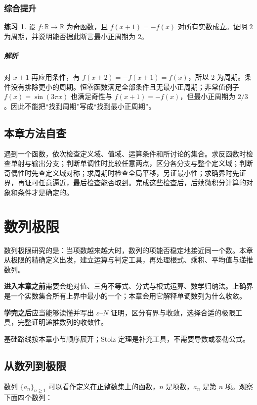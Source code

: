 \documentclass[UTF8,fontset=fandol,12pt,oneside,openany]{ctexrep}
\newcommand{\R}{\mathbb R}
\theoremstyle{definition}
\newtheorem{exercise}{练习}[chapter]
\begin{document}
\subsection{综合提升}
\begin{exercise}
设 $f:\R\to\R$ 为奇函数，且 $f(x+1)=-f(x)$ 对所有实数成立。证明 $2$ 为周期，并说明能否据此断言最小正周期为 $2$。
\end{exercise}
\paragraph{解析} 对 $x+1$ 再应用条件，有 $f(x+2)=-f(x+1)=f(x)$，所以 $2$ 为周期。条件没有排除更小的周期。恒零函数满足全部条件且无最小正周期；非常值例子 $f(x)=\sin(3\pi x)$ 也满足奇性与 $f(x+1)=-f(x)$，但最小正周期为 $2/3$。因此不能把“找到周期”写成“找到最小正周期”。

\section{本章方法自查}
遇到一个函数，依次检查定义域、值域、运算条件和所讨论的集合。求反函数时检查单射与输出分支；判断单调性时比较任意两点，区分各分支与整个定义域；判断奇偶性时先查定义域对称；求周期时检查全局平移，另证最小性；求确界时先证界，再证可任意逼近，最后检查能否取到。完成这些检查后，后续微积分计算的对象和条件才是确定的。


\chapter{数列极限}
\label{lec:02:chapter}

数列极限研究的是：当项数越来越大时，数列的项能否稳定地接近同一个数。本章从极限的精确定义出发，建立运算与判定工具，再处理根式、乘积、平均值与递推数列。


\textbf{进入本章之前}\quad 需要会绝对值、三角不等式、分式与根式运算、数学归纳法。上确界是一个实数集合所有上界中最小的一个；本章会用它解释单调数列为什么收敛。

\textbf{学完之后}\quad 应当能够读懂并写出 $\varepsilon$--$N$ 证明，区分有界与收敛，选择合适的极限工具，完整证明递推数列的收敛性。

基础路线按本章小节顺序展开；Stolz 定理是补充工具，不需要导数或泰勒公式。


\section{从数列到极限}

数列 $\{a_n\}_{n\ge1}$ 可以看作定义在正整数集上的函数，$n$ 是项数，$a_n$ 是第 $n$ 项。观察下面四个数列：
\end{document}
